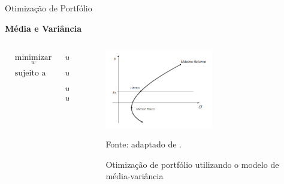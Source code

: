     \begin{frame}{Otimização de Portfólio}


        \LARGE \textbf{Média e Variância}

        \begin{columns}
            \begin{column}{0.5\textwidth}

                \begin{equation}
                    \label{eq:markowitz}
                    \begin{aligned}
                        & \underset{w}{\text{minimizar}}
                        & & w^T \Sigma w \\
                        & \text{sujeito a}
                        & & w^T \mu = \mu_p \\
                        & & & w^T \mathbf{1} = 1 \\
                        & & & w \geq 0
                    \end{aligned}
                \end{equation}
        
            \end{column}
            \begin{column}{0.5\textwidth}

                \begin{figure}[htbp]
                    \centering
                    \caption{Otimização de portfólio utilizando o modelo de média-variância}
                    \label{fig:mínimo_risco}
                    \includegraphics[width=0.6\textwidth]{images/minimo_risco.png}
                    \par \footnotesize Fonte: adaptado de \citeauthor{mansini2015linear}.
                \end{figure}
        
            \end{column}
        \end{columns}
        

    \end{frame}





